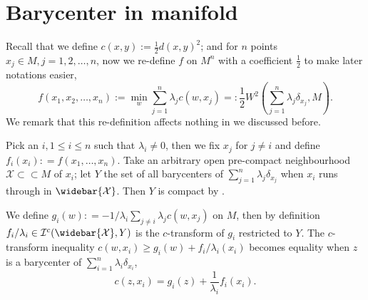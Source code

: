 \section{Barycenter in manifold}

\label{section:barycenter_manifold}
Recall that we define $c(x, y):=\frac{1}{2} d(x, y)^2$;
and for $n$ points $x_j \in M, j=1,2,\ldots,n$, now we re-define $f$ on $M^n$ with a coefficient $\frac{1}{2}$
to make later notations easier,
\[
	f(x_1, x_2, \ldots, x_n) := \min_{w} \sum_{j=1}^n \lambda_j c(w, x_j) =: \frac{1}{2}W^2(\sum_{j=1}^n \lambda_j \delta_{x_j}, M).
\]
We remark that this re-definition affects nothing in we discussed before.

Pick an $i, 1 \leq i \leq n$ such that $\lambda_i \neq 0$, then we fix $x_j$ for $j \neq i$ and
define $f_i (x_i) : = f(x_1, \ldots, x_n)$.
Take an arbitrary open pre-compact neighbourhood $\mathcal{X} \subset \subset M$ of $x_i$;
let $Y$ the set of all barycenters of $\sum_{j=1}^n \lambda_j \delta_{x_j}$
when $x_i$ runs through in $\widebar{ \mathcal{X} }$.
Then $Y$ is compact by .

We define $g_i(w): = - 1/ \lambda_i \sum_{j \neq i} \lambda_j c(w, x_j) $ on $M$,
then by definition $f_i /\lambda_i \in \mathcal{I}^c (\widebar{ \mathcal{X}}, Y)$
is the $c$-transform of
$g_i$ restricted to $Y$.
The $c$-transform inequality
$ c(w, x_i) \geq g_i(w) + f_i / \lambda_i (x_i)$
becomes equality when $z$ is a barycenter of $\sum_{i=1}^{n} \lambda_i \delta_{x_i}$,
\begin{equation}
	\label{equa:g_i_conjugate}
	c(z, x_i) = g_i(z) + \frac{1}{\lambda_i} f_i(x_i).
\end{equation}

